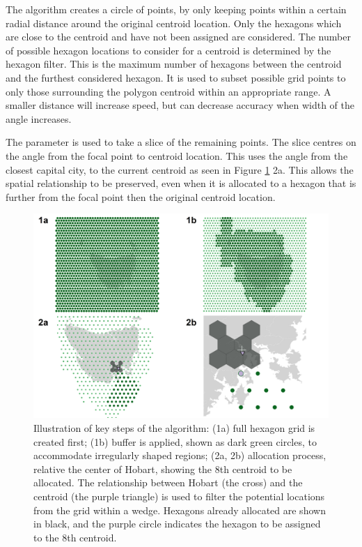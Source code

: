 The algorithm creates a circle of points, by only keeping points within
a certain radial distance around the original centroid location. Only
the hexagons which are close to the centroid and have not been assigned
are considered. The number of possible hexagon locations to consider for
a centroid is determined by the hexagon filter. This is the maximum
number of hexagons between the centroid and the furthest considered
hexagon. It is used to subset possible grid points to only those
surrounding the polygon centroid within an appropriate range. A smaller
distance will increase speed, but can decrease accuracy when width of
the angle increases.

The  parameter is used to take a slice of the remaining
points. The slice centres on the angle from the focal point to centroid
location. This uses the angle from the closest capital city, to the
current centroid as seen in Figure \ref{fig:filterprocess} 2a. This
allows the spatial relationship to be preserved, even when it is
allocated to a hexagon that is further from the focal point then the
original centroid location.

\begin{Schunk}
\begin{figure}
\includegraphics[width=0.95\linewidth]{kobakian-cook_files/figure-latex/filterprocess-1} \caption[Illustration of key steps of the algorithm]{Illustration of key steps of the algorithm: (1a) full hexagon grid is created first; (1b) buffer is applied, shown as dark green circles, to accommodate irregularly shaped regions; (2a, 2b) allocation process, relative the center of Hobart, showing the 8th centroid to be allocated. The relationship between Hobart (the cross) and the centroid (the purple triangle) is used to filter the potential locations from the grid within a wedge. Hexagons already allocated are shown in black, and the purple circle indicates the hexagon to be assigned to the 8th centroid.}\label{fig:filterprocess}
\end{figure}
\end{Schunk}

